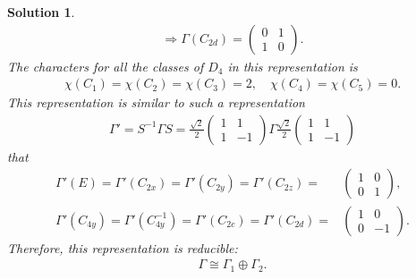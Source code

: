 \documentclass[UTF8,10pt,a4paper]{article}
\theoremstyle{Problem}
\theoremstyle{Solution}
\newtheorem*{sol}{Solution}
\begin{document}
\begin{sol}
\begin{gather}
        \Longrightarrow\Gamma(C_{2d})=\left(\begin{matrix}
            0&1\\
            1&0
        \end{matrix}\right).
    \end{gather}
    The characters for all the classes of $D_4$ in this representation is
    \begin{align}
        \chi(C_1)=\chi(C_2)=\chi(C_3)=2,\quad\chi(C_4)=\chi(C_5)=0.
    \end{align}
    This representation is similar to such a representation
    \begin{align}
        \Gamma'=S^{-1}\Gamma S=\frac{\sqrt{2}}{2}\left(\begin{matrix}
            1&1\\
            1&-1
        \end{matrix}\right)\Gamma\frac{\sqrt{2}}{2}\left(\begin{matrix}
            1&1\\
            1&-1
        \end{matrix}\right)
    \end{align}
    that
    \begin{align}
        \Gamma'(E)=\Gamma'(C_{2x})=\Gamma'(C_{2y})=\Gamma'(C_{2z})=&\left(\begin{matrix}
            1&0\\
            0&1
        \end{matrix}\right),\\
        \Gamma'(C_{4y})=\Gamma'(C_{4y}^{-1})=\Gamma'(C_{2c})=\Gamma'(C_{2d})=&\left(\begin{matrix}
            1&0\\
            0&-1
        \end{matrix}\right).
    \end{align}
    Therefore, this representation is reducible:
    \begin{align}
        \Gamma\cong\Gamma_1\oplus\Gamma_2.
    \end{align}
\end{sol}
\end{document}
